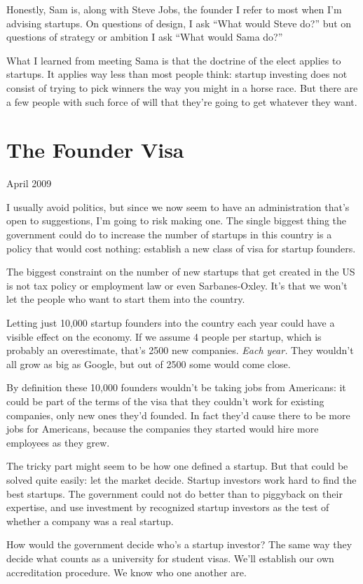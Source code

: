 \documentclass[12pt]{book}
\begin{document}
Honestly, Sam is, along with Steve Jobs, the founder I refer to most
when I'm advising startups. On questions of design, I ask ``What would
Steve do?'' but on questions of strategy or ambition I ask ``What would
Sama do?''

What I learned from meeting Sama is that the doctrine of the elect
applies to startups. It applies way less than most people think: startup
investing does not consist of trying to pick winners the way you might
in a horse race. But there are a few people with such force of will that
they're going to get whatever they want.
\chapter{The Founder Visa}

April 2009

I usually avoid politics, but since we now seem to have an
administration that's open to suggestions, I'm going to risk making one.
The single biggest thing the government could do to increase the number
of startups in this country is a policy that would cost nothing:
establish a new class of visa for startup founders.

The biggest constraint on the number of new startups that get created in
the US is not tax policy or employment law or even Sarbanes-Oxley. It's
that we won't let the people who want to start them into the country.

Letting just 10,000 startup founders into the country each year could
have a visible effect on the economy. If we assume 4 people per startup,
which is probably an overestimate, that's 2500 new companies. \emph{Each
year.} They wouldn't all grow as big as Google, but out of 2500 some
would come close.

By definition these 10,000 founders wouldn't be taking jobs from
Americans: it could be part of the terms of the visa that they couldn't
work for existing companies, only new ones they'd founded. In fact
they'd cause there to be more jobs for Americans, because the companies
they started would hire more employees as they grew.

The tricky part might seem to be how one defined a startup. But that
could be solved quite easily: let the market decide. Startup investors
work hard to find the best startups. The government could not do better
than to piggyback on their expertise, and use investment by recognized
startup investors as the test of whether a company was a real startup.

How would the government decide who's a startup investor? The same way
they decide what counts as a university for student visas. We'll
establish our own accreditation procedure. We know who one another are.
\end{document}
